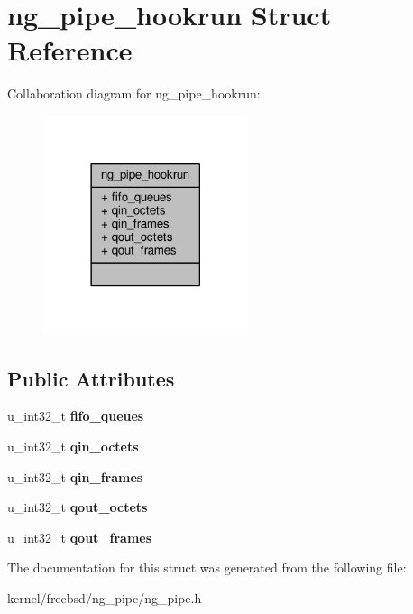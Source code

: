 \hypertarget{structng__pipe__hookrun}{\section{ng\+\_\+pipe\+\_\+hookrun Struct Reference}
\label{structng__pipe__hookrun}
}


Collaboration diagram for ng\+\_\+pipe\+\_\+hookrun\+:
\nopagebreak
\begin{figure}[H]
\begin{center}
\leavevmode
\includegraphics[width=170pt]{structng__pipe__hookrun__coll__graph}
\end{center}
\end{figure}
\subsection*{Public Attributes}
\begin{DoxyCompactItemize}
\item 
\hypertarget{structng__pipe__hookrun_ac0979c366f837b8cd8227fd152adbc1f}{u\+\_\+int32\+\_\+t {\bfseries fifo\+\_\+queues}}\label{structng__pipe__hookrun_ac0979c366f837b8cd8227fd152adbc1f}

\item 
\hypertarget{structng__pipe__hookrun_aee9ac2ee2aa327faf9c2ac41ca11d9a6}{u\+\_\+int32\+\_\+t {\bfseries qin\+\_\+octets}}\label{structng__pipe__hookrun_aee9ac2ee2aa327faf9c2ac41ca11d9a6}

\item 
\hypertarget{structng__pipe__hookrun_aa04191234a962c92f42adf4d2ff7947f}{u\+\_\+int32\+\_\+t {\bfseries qin\+\_\+frames}}\label{structng__pipe__hookrun_aa04191234a962c92f42adf4d2ff7947f}

\item 
\hypertarget{structng__pipe__hookrun_a3ffb04ff1e74339ea6ac3e6921c222e6}{u\+\_\+int32\+\_\+t {\bfseries qout\+\_\+octets}}\label{structng__pipe__hookrun_a3ffb04ff1e74339ea6ac3e6921c222e6}

\item 
\hypertarget{structng__pipe__hookrun_afc5c276cc51a55910fbc17b094011f6a}{u\+\_\+int32\+\_\+t {\bfseries qout\+\_\+frames}}\label{structng__pipe__hookrun_afc5c276cc51a55910fbc17b094011f6a}

\end{DoxyCompactItemize}


The documentation for this struct was generated from the following file\+:\begin{DoxyCompactItemize}
\item 
kernel/freebsd/ng\+\_\+pipe/ng\+\_\+pipe.\+h\end{DoxyCompactItemize}
